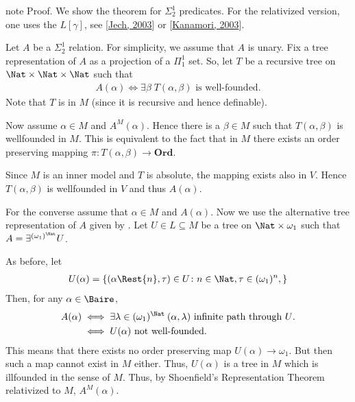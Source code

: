 \documentclass[letterpaper,10pt,english]{jupyterBook}
\begin{document}
\begin{sphinxadmonition}{note}
\sphinxAtStartPar
Proof. We show the theorem for \(\Sigma^1_2\) predicates. For the relativized version, one uses the  \(L[\gamma]\), see {[}\hyperlink{cite.bibliography:id8}{Jech, 2003}{]} or {[}\hyperlink{cite.bibliography:id9}{Kanamori, 2003}{]}.

\sphinxAtStartPar
Let \(A\) be a \(\Sigma^1_2\) relation. For simplicity, we assume that \(A\) is unary. Fix a tree representation of \(A\) as a projection of a \(\Pi^1_1\) set. So, let \(T\) be a recursive tree on \(\Nat \times \Nat \times \Nat\) such that
\begin{equation*}
\begin{split}
     A(\alpha) \iff \exists \beta \;  T(\alpha,\beta) \text{ is well-founded}. 
\end{split}
\end{equation*}
\sphinxAtStartPar
Note that \(T\) is in \(M\) (since it is recursive and hence definable).

\sphinxAtStartPar
Now assume \(\alpha \in M\) and \(A^M(\alpha)\). Hence there is a \(\beta \in M\) such that \(T(\alpha,\beta)\) is well\sphinxhyphen{}founded in \(M\). This is equivalent to the fact that in \(M\) there exists an order preserving mapping \(\pi: T(\alpha,\beta) \to \mathbf{Ord}\).

\sphinxAtStartPar
Since \(M\) is an inner model and \(T\) is absolute, the mapping exists also in \(V\). Hence \(T(\alpha,\beta)\) is well\sphinxhyphen{}founded in \(V\) and thus \(A(\alpha)\).

\sphinxAtStartPar
For the converse assume that \(\alpha \in M\) and \(A(\alpha)\). Now we use the alternative tree representation of \(A\) given by {\hyperref[\detokenize{shoenfield:thm-tree-repr-sig12}]{}}. Let \(U \in L \subseteq M\) be a tree on \(\Nat \times \omega_1\) such that \(A = \exists^{(\omega_1)^\Nat} U\).

\sphinxAtStartPar
As before, let
\begin{equation*}
\begin{split}
	U(\alpha) = \{ (\alpha\Rest{n}, \tau)\in U \colon n \in \Nat, \tau \in (\omega_1)^n,  \}
\end{split}
\end{equation*}
\sphinxAtStartPar
Then, for any \(\alpha \in \Baire\),
\begin{align*}
	A(\alpha)     & \iff    \exists \lambda \in (\omega_1)^\Nat \: (\alpha,\lambda) \text{ infinite path through $U$}. \\
     & \iff    U(\alpha) \text{ not well-founded}. \\
\end{align*}
\sphinxAtStartPar
This means that there exists no order preserving map \(U(\alpha) \to \omega_1\). But then such a map cannot exist in \(M\) either. Thus, \(U(\alpha)\) is a tree in \(M\) which is ill\sphinxhyphen{}founded in the sense of \(M\). Thus, by Shoenfield’s Representation Theorem relativized to \(M\), \(A^M(\alpha)\).


\end{sphinxadmonition}
\end{document}
